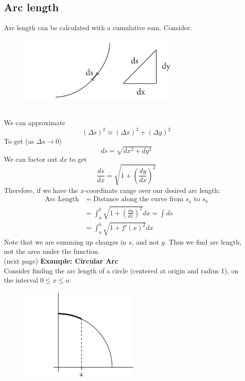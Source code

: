 \documentclass{report}
\begin{document}
\subsection{Arc length} %
Arc length can be calculated with a cumulative sum. Consider:
\begin{figure}[h]
\includegraphics[width=8cm]{Capture45}\\
\centering
{}
\end{figure}\\
We can approximate
\begin{equation*}
(\Delta s)^2\approx(\Delta x)^2+(\Delta y)^2
\end{equation*}
To get (as $\Delta s\to0$)
\begin{equation*}
ds=\sqrt{dx^2+dy^2}
\end{equation*}
We can factor out $dx$ to get
\begin{equation*}
\frac{ds}{dx}=\sqrt{1+\left(\frac{dy}{dx}\right)^2}
\end{equation*}
Therefore, if we have the $x$-coordinate range over our desired arc length:
\begin{align*}
\text{Arc Length}&=\text{Distance along the curve from $s_a$ to $s_b$}\\
&=\int_a^b\sqrt{1+\left(\frac{dy}{dx}\right)^2}dx=\int ds\\
&=\int_a^b\sqrt{1+f'(x)^2}dx
\end{align*}
Note that we are summing up changes in $s$, and not $y$. Thus we find arc length, not the area under the function.\\
(next page)
\newpage
\noindent\textbf{Example: Circular Arc}\\
Consider finding the arc length of a circle (centered at origin and radius 1), on 
the interval $0\leq x\leq a$:
\begin{figure}[h]
\includegraphics[width=6cm]{Capture46}\\
\centering
{}
\end{figure}\\
\end{document}
